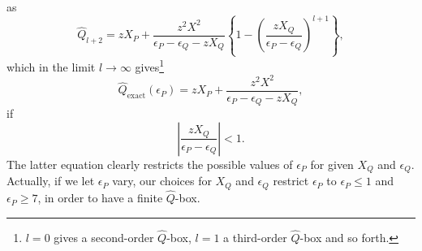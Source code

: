 as
\[
               \hat{Q}_{l+2}=
                zX_P+\frac{z^2X^2}{\epsilon_P -\epsilon_Q-zX_Q}
                \left\{1-\left(\frac{zX_Q}
                {\epsilon_P-\epsilon_Q}\right)^{l+1}\right\},
\]
which in the limit $l\rightarrow \infty$ 
gives\footnote{$l=0$ gives a second-order $\hat{Q}$-box, $l=1$ a third-order
$\hat{Q}$-box and so forth.} 
\begin{equation}
      \hat{Q}_{\mathrm{exact}}(\epsilon_P)=
      zX_P+\frac{z^2X^2}{\epsilon_P -\epsilon_Q-zX_Q},
      \label{eq:qexact}
\end{equation}
if
\begin{equation}
     \left|\frac{zX_Q}{\epsilon_P-\epsilon_Q}\right| < 1.
     \label{eq:constr}
\end{equation}
The latter equation clearly restricts the possible 
values of $\epsilon_P$ for
given $X_Q$ and $\epsilon_Q$. Actually, 
if we let $\epsilon_P$ vary, our choices
for $X_Q$ and $\epsilon_Q$ restrict $\epsilon_P$ to 
$\epsilon_P \leq 1$ and $\epsilon_P\geq 7$, in order 
to have a finite $\hat{Q}$-box.
 
